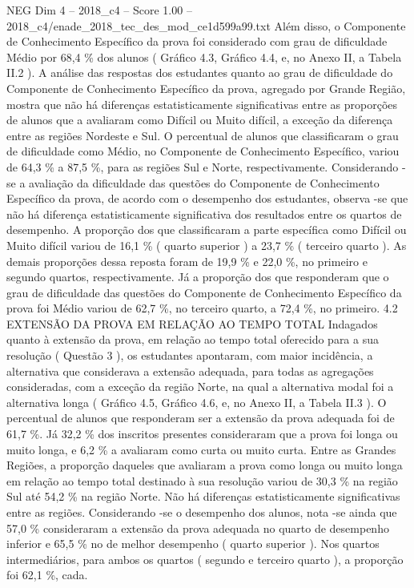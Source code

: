 \begin{textsample}{NEG Dim 4 – 2018\_c4 – Score 1.00 – 2018\_c4/enade\_2018\_tec\_des\_mod\_ce1d599a99.txt}
Além disso, o Componente de Conhecimento Específico da prova foi considerado com grau de dificuldade Médio por 68,4 \% dos alunos ( Gráfico 4.3, Gráfico 4.4, e, no Anexo II, a Tabela II.2 ).
A análise das respostas dos estudantes quanto ao grau de dificuldade do Componente de Conhecimento Específico da prova, agregado por Grande Região, mostra que não há diferenças estatisticamente significativas entre as proporções de alunos que a avaliaram como Difícil ou Muito difícil, a exceção da diferença entre as regiões Nordeste e Sul.
O percentual de alunos que classificaram o grau de dificuldade como Médio, no Componente de Conhecimento Específico, variou de 64,3 \% a 87,5 \%, para as regiões Sul e Norte, respectivamente.
Considerando -se a avaliação da dificuldade das questões do Componente de Conhecimento Específico da prova, de acordo com o desempenho dos estudantes, observa -se que não há diferença estatisticamente significativa dos resultados entre os quartos de desempenho.
A proporção dos que classificaram a parte específica como Difícil ou Muito difícil variou de 16,1 \% ( quarto superior ) a 23,7 \% ( terceiro quarto ).
As demais proporções dessa reposta foram de 19,9 \% e 22,0 \%, no primeiro e segundo quartos, respectivamente.
Já a proporção dos que responderam que o grau de dificuldade das questões do Componente de Conhecimento Específico da prova foi Médio variou de 62,7 \%, no terceiro quarto, a 72,4 \%, no primeiro. 4.2 EXTENSÃO DA PROVA EM RELAÇÃO AO TEMPO TOTAL Indagados quanto à extensão da prova, em relação ao tempo total oferecido para a sua resolução ( Questão 3 ), os estudantes apontaram, com maior incidência, a alternativa que considerava a extensão adequada, para todas as agregações consideradas, com a exceção da região Norte, na qual a alternativa modal foi a alternativa longa ( Gráfico 4.5, Gráfico 4.6, e, no Anexo II, a Tabela II.3 ).
O percentual de alunos que responderam ser a extensão da prova adequada foi de 61,7 \%.
Já 32,2 \% dos inscritos presentes consideraram que a prova foi longa ou muito longa, e 6,2 \% a avaliaram como curta ou muito curta.
Entre as Grandes Regiões, a proporção daqueles que avaliaram a prova como longa ou muito longa em relação ao tempo total destinado à sua resolução variou de 30,3 \% na região Sul até 54,2 \% na região Norte.
Não há diferenças estatisticamente significativas entre as regiões.
Considerando -se o desempenho dos alunos, nota -se ainda que 57,0 \% consideraram a extensão da prova adequada no quarto de desempenho inferior e 65,5 \% no de melhor desempenho ( quarto superior ).
Nos quartos intermediários, para ambos os quartos ( segundo e terceiro quarto ), a proporção foi 62,1 \%, cada.

\end{textsample}
